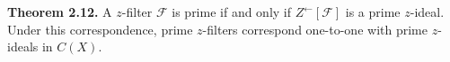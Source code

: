 \textbf{Theorem 2.12.} A $z$-filter $\mathcal{F}$ is prime if and only if $Z^{\leftarrow}[\mathcal{F}]$ is a prime $z$-ideal. Under this correspondence, prime $z$-filters correspond one-to-one with prime $z$-ideals in $C(X)$.
